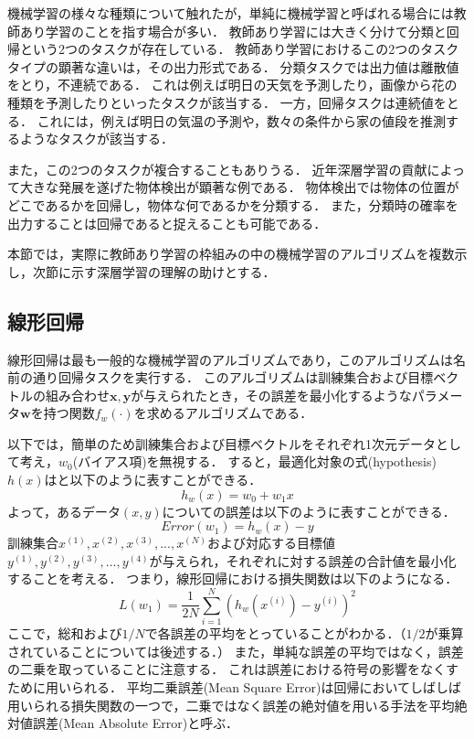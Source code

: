     機械学習の様々な種類について触れたが，単純に機械学習と呼ばれる場合には教師あり学習のことを指す場合が多い．
    教師あり学習には大きく分けて分類と回帰という2つのタスクが存在している．
    教師あり学習におけるこの2つのタスクタイプの顕著な違いは，その出力形式である．
    分類タスクでは出力値は離散値をとり，不連続である．
    これは例えば明日の天気を予測したり，画像から花の種類を予測したりといったタスクが該当する．
    一方，回帰タスクは連続値をとる．
    これには，例えば明日の気温の予測や，数々の条件から家の値段を推測するようなタスクが該当する．
    
    また，この2つのタスクが複合することもありうる．
    近年深層学習の貢献によって大きな発展を遂げた物体検出が顕著な例である．
    物体検出では物体の位置がどこであるかを回帰し，物体な何であるかを分類する．
    また，分類時の確率を出力することは回帰であると捉えることも可能である．
    
    本節では，実際に教師あり学習の枠組みの中の機械学習のアルゴリズムを複数示し，次節に示す深層学習の理解の助けとする．

\subsection{線形回帰}
    線形回帰は最も一般的な機械学習のアルゴリズムであり，このアルゴリズムは名前の通り回帰タスクを実行する．
    このアルゴリズムは訓練集合および目標ベクトルの組み合わせ${\bm{x},\bm{y}}$が与えられたとき，その誤差を最小化するようなパラメータ$\bm{w}$を持つ関数$f_w(\cdot )$を求めるアルゴリズムである．
    
    以下では，簡単のため訓練集合および目標ベクトルをそれぞれ1次元データとして考え，$w_0$(バイアス項)を無視する．
    すると，最適化対象の式(hypothesis)$h(x)$はと以下のように表すことができる．
    \begin{equation}
        h_w(x) = w_0 + w_1 x
    \end{equation}
    よって，あるデータ$(x, y)$についての誤差は以下のように表すことができる．
    \begin{equation}
        Error(w_1) = h_w\left(x\right)-y
    \end{equation}
    訓練集合${x^{(1)}, x^{(2)}, x^{(3)}, ... , x^{(N)}}$および対応する目標値${y^{(1)}, y^{(2)}, y^{(3)}, ... , y^{(4)}}$が与えられ，それぞれに対する誤差の合計値を最小化することを考える．
    つまり，線形回帰における損失関数は以下のようになる．
    \begin{equation}
        L(w_1) = \frac{1}{2N}\sum_{i=1}^{N}\left(h_w (x^{(i)})-y^{(i)}\right)^2
    \end{equation}
    ここで，総和および$1/N$で各誤差の平均をとっていることがわかる．（$1/2$が乗算されていることについては後述する．）
    また，単純な誤差の平均ではなく，誤差の二乗を取っていることに注意する．
    これは誤差における符号の影響をなくすために用いられる．
    平均二乗誤差(Mean Square Error)は回帰においてしばしば用いられる損失関数の一つで，二乗ではなく誤差の絶対値を用いる手法を平均絶対値誤差(Mean Absolute Error)と呼ぶ．
    
